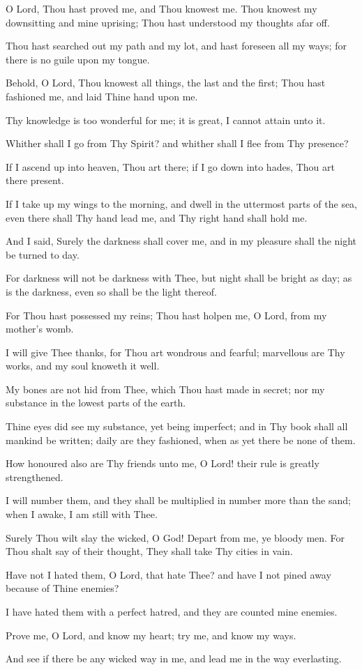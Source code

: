 O Lord, Thou hast proved me, and Thou knowest me. Thou knowest my downsitting and mine uprising; Thou hast understood my thoughts afar off.

Thou hast searched out my path and my lot, and hast foreseen all my ways; for there is no guile upon my tongue.

Behold, O Lord, Thou knowest all things, the last and the first; Thou hast fashioned me, and laid Thine hand upon me.

Thy knowledge is too wonderful for me; it is great, I cannot attain unto it.

Whither shall I go from Thy Spirit? and whither shall I flee from Thy presence?

If I ascend up into heaven, Thou art there; if I go down into hades, Thou art there present.

If I take up my wings to the morning, and dwell in the uttermost parts of the sea, even there shall Thy hand lead me, and Thy right hand shall hold me.

And I said, Surely the darkness shall cover me, and in my pleasure shall the night be turned to day.

For darkness will not be darkness with Thee, but night shall be bright as day; as is the darkness, even so shall be the light thereof.

For Thou hast possessed my reins; Thou hast holpen me, O Lord, from my mother's womb.

I will give Thee thanks, for Thou art wondrous and fearful; marvellous are Thy works, and my soul knoweth it well.

My bones are not hid from Thee, which Thou hast made in secret; nor my substance in the lowest parts of the earth.

Thine eyes did see my substance, yet being imperfect; and in Thy book shall all mankind be written; daily are they fashioned, when as yet there be none of them.

How honoured also are Thy friends unto me, O Lord! their rule is greatly strengthened.

I will number them, and they shall be multiplied in number more than the sand; when I awake, I am still with Thee.

Surely Thou wilt slay the wicked, O God! Depart from me, ye bloody men. For Thou shalt say of their thought, They shall take Thy cities in vain.

Have not I hated them, O Lord, that hate Thee? and have I not pined away because of Thine enemies?

I have hated them with a perfect hatred, and they are counted mine enemies.

Prove me, O Lord, and know my heart; try me, and know my ways.

And see if there be any wicked way in me, and lead me in the way everlasting.
